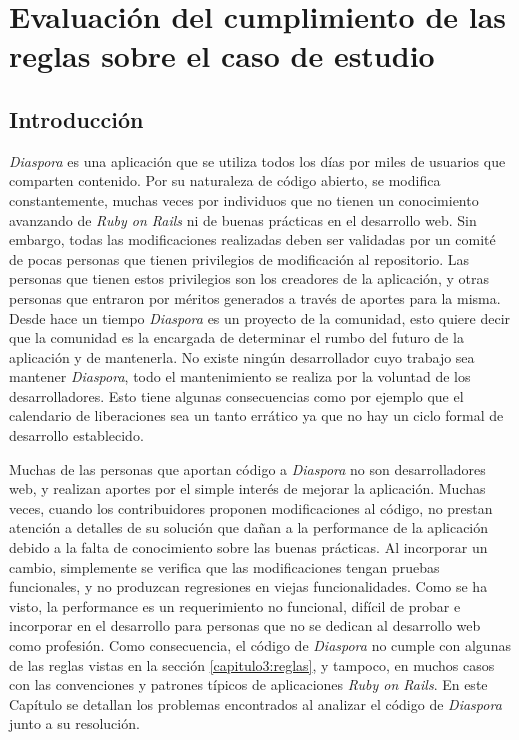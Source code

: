 \chapter{Evaluación del cumplimiento de las reglas sobre el caso de estudio}
\label{capitulo6}

\section{Introducción}
\label{capitulo6:introduccion}

\emph{Diaspora} es una aplicación que se utiliza todos los días por miles de usuarios que comparten contenido. Por su naturaleza de código abierto, se modifica
constantemente, muchas veces por individuos que no tienen un conocimiento avanzando de \emph{Ruby on Rails} ni de buenas prácticas en el desarrollo web. Sin embargo, todas las
modificaciones realizadas deben ser validadas por un comité de pocas personas que tienen privilegios de modificación al repositorio. Las personas que tienen estos privilegios son los
creadores de la aplicación, y otras personas que entraron por méritos generados a través de aportes para la misma. Desde hace un tiempo \emph{Diaspora} es un proyecto de la 
comunidad, esto quiere decir que la comunidad es la encargada de determinar el rumbo del futuro de la aplicación y de mantenerla. No existe ningún desarrollador cuyo trabajo sea 
mantener \emph{Diaspora}, todo el mantenimiento se realiza por la voluntad de los desarrolladores. Esto tiene algunas consecuencias como por ejemplo que el calendario de 
liberaciones sea un tanto errático ya que no hay un ciclo formal de desarrollo establecido. 

Muchas de las personas que aportan código a \emph{Diaspora} no son desarrolladores web, y realizan aportes por el simple interés de mejorar la aplicación.
Muchas veces, cuando los contribuidores proponen modificaciones al código, no prestan atención a detalles de su solución que dañan a la performance de la aplicación debido a la
falta de conocimiento sobre las buenas prácticas. Al incorporar un cambio, simplemente se verifica que las modificaciones tengan pruebas funcionales, y no produzcan regresiones en 
viejas funcionalidades. Como se ha visto, la performance es un requerimiento no funcional, difícil de probar e incorporar en el desarrollo para personas que no se dedican al 
desarrollo web como profesión. Como consecuencia, el código de \emph{Diaspora} no cumple con algunas de las reglas vistas en la sección \ref{capitulo3:reglas}, y 
tampoco, en muchos casos con las convenciones y patrones típicos de aplicaciones \emph{Ruby on Rails}. En este Capítulo se detallan los problemas encontrados al analizar el 
código de \emph{Diaspora} junto a su resolución.

